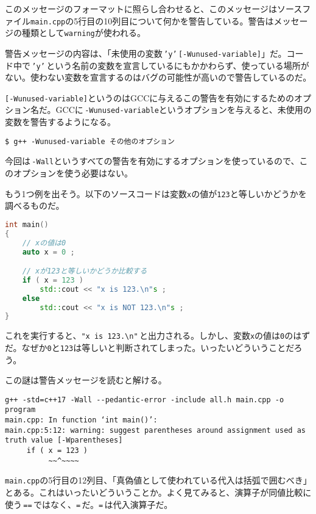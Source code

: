 このメッセージのフォーマットに照らし合わせると、このメッセージはソースファイル\texttt{main.cpp}の5行目の10列目について何かを警告している。警告はメッセージの種類として\texttt{warning}が使われる。

警告メッセージの内容は、「未使用の変数\,\texttt{'y'}\,\texttt{[-Wunused-variable]}」だ。コード中で\,\texttt{'y'}\,という名前の変数を宣言しているにもかかわらず、使っている場所がない。使わない変数を宣言するのはバグの可能性が高いので警告しているのだ。

\texttt{[-Wunused-variable]}というのはGCCに与えるこの警告を有効にするためのオプション名だ。GCCに\,\texttt{-Wunused-variable}というオプションを与えると、未使用の変数を警告するようになる。

\begin{lstlisting}[style=terminal]
$ g++ -Wunused-variable その他のオプション
\end{lstlisting}

今回は\,\texttt{-Wall}というすべての警告を有効にするオプションを使っているので、このオプションを使う必要はない。

もう1つ例を出そう。以下のソースコードは変数\texttt{x}の値が\texttt{123}と等しいかどうかを調べるものだ。

\begin{lstlisting}[language={C++}]
int main()
{
    // xの値は0
    auto x = 0 ;

    // xが123と等しいかどうか比較する
    if ( x = 123 )
        std::cout << "x is 123.\n"s ;
    else
        std::cout << "x is NOT 123.\n"s ;
}
\end{lstlisting}

これを実行すると、\texttt{"x is 123.{\textbackslash}n"}\,と出力される。しかし、変数\texttt{x}の値は\texttt{0}のはずだ。なぜか\texttt{0}と\texttt{123}は等しいと判断されてしまった。いったいどういうことだろう。

この謎は警告メッセージを読むと解ける。

\begin{lstlisting}[style=terminal]
g++ -std=c++17 -Wall --pedantic-error -include all.h main.cpp -o program
main.cpp: In function ‘int main()’:
main.cpp:5:12: warning: suggest parentheses around assignment used as truth value [-Wparentheses]
     if ( x = 123 )
          ~~^~~~~
\end{lstlisting}

\texttt{main.cpp}の5行目の12列目、「真偽値として使われている代入は括弧で囲むべき」とある。これはいったいどういうことか。よく見てみると、演算子が同値比較に使う\,\texttt{==}\,ではなく、\texttt{=}\,だ。\texttt{=}\,は代入演算子だ。

